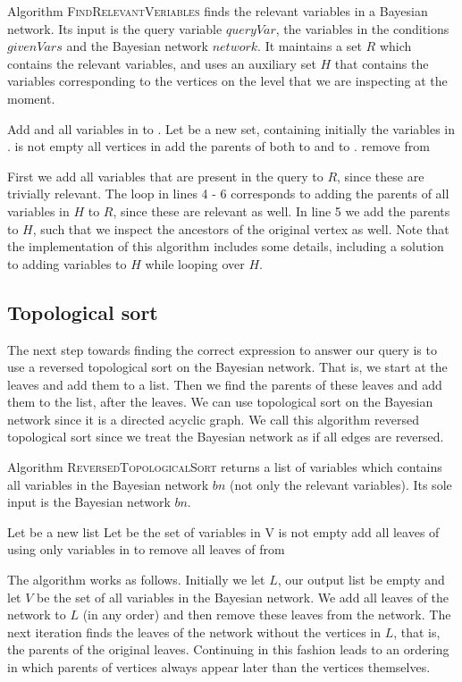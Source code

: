 \documentclass[10pt,a4paper]{article}
\begin{document}
Algorithm \textsc{FindRelevantVeriables} finds the relevant variables in a Bayesian network. Its input is the query variable $queryVar$, the variables in the conditions $givenVars$ and the Bayesian network $network$. It maintains a set $R$ which contains the relevant variables, and uses an auxiliary set $H$ that contains the variables corresponding to the vertices on the level that we are inspecting at the moment.
\begin{codebox}
\li Add  and all variables in  to .
\li Let  be a new set, containing initially the variables in .
\li \While {} is not empty 
\li	\Do
		\For all vertices  in  
\li \Do
			add the parents of  both to  and to .
\li			remove  from 
		\End
	\End
\li \Return {}
\end{codebox}
First we add all variables that are present in the query to $R$, since these are trivially relevant. The loop in lines 4 - 6 corresponds to adding the parents of all variables in $H$ to $R$, since these are relevant as well. In line 5 we add the parents to $H$, such that we inspect the ancestors of the original vertex as well. Note that the implementation of this algorithm includes some details, including a solution to adding variables to $H$ while looping over $H$.
\subsection{Topological sort}
The next step towards finding the correct expression to answer our query is to use a reversed topological sort on the Bayesian network. That is, we start at the leaves and add them to a list. Then we find the parents of these leaves and add them to the list, after the leaves. We can use topological sort on the Bayesian network since it is a directed acyclic graph. We call this algorithm reversed topological sort since we treat the Bayesian network as if all edges are reversed. 

Algorithm \textsc{ReversedTopologicalSort} returns a list of variables which contains all variables in the Bayesian network $bn$ (not only the relevant variables). Its sole input is the Bayesian network $bn$. 
\begin{codebox}
\li Let  be a new list
\li Let  be the set of variables in 
\li \While V is not empty \Do 
\li		add all leaves of  using only variables in  to 
\li		remove all leaves of  from 
	\End
\li \Return {}
\end{codebox}
The algorithm works as follows. Initially we let $L$, our output list be empty and let $V$ be the set of all variables in the Bayesian network. We add all leaves of the network to $L$ (in any order) and then remove these leaves from the network. The next iteration finds the leaves of the network without the vertices in $L$, that is, the parents of the original leaves. Continuing in this fashion leads to an ordering in which parents of vertices always appear later than the vertices themselves.
\end{document}
